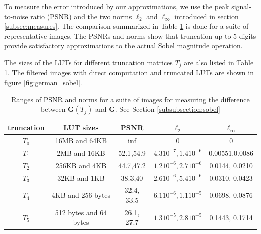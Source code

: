 \documentclass[12pt]{amsart}
\theoremstyle{definition}
\theoremstyle{remark}
\numberwithin{thm}{section}
\begin{document}
To measure the error introduced by our approximations, we use the peak signal-to-noise ratio (PSNR) and the two norms $\ell_2$ and $\ell_{\infty}$ introduced in section \ref{subsec:measures}. The comparison summarized in Table \ref{tbl:sobel} is done for a suite of representative images. The PSNRs and norms show that truncation up to $5$ digits provide satisfactory approximations to the actual Sobel magnitude operation.

The sizes of the LUTs for different truncation matrices $T_j$ are also listed in Table \ref{tbl:sobel}. The filtered images with direct computation and truncated LUTs are shown in figure \ref{fig:german_sobel}.

\begin{center}
\begin{table}
    \begin{tabular}{ | c | c | c | c | c | }
    \hline
    \hline
truncation &	LUT sizes	&PSNR 	&$\ell_2$ 	&$\ell_{\infty}$ \\ \hline
$T_0$&	16MB and 64KB		&$\inf$		&0	&0\\ \hline
$T_1$&	2MB and 16KB		&52.1,54.9	&$4.3 10^{-7}, 1.4 10^{-6}$	&0.00551,0.0086\\ \hline
$T_2$&	256KB and 4KB		&44.7,47.2	&$1.2 10^{-6}, 2.7 10^{-6}$	&0.0144, 0.0210\\ \hline
$T_3$&	32KB and 1KB		&38.3,40	&$2.6 10^{-6}, 5.4 10^{-6}$	&0.0310, 0.0423\\ \hline
$T_4$&	4KB	and 256 bytes	&32.4, 33.5	&$6.1 10^{-6}, 1.1 10^{-5}$	&0.0698, 0.0876\\ \hline
$T_5$&	512 bytes and 64 bytes &26.1, 27.7	&$1.3 10^{-5}, 2.8 10^{-5}$		&0.1443, 0.1714\\ \hline
 \end{tabular}
\caption{Ranges of PSNR and norms for a suite of images for measuring the difference between $\mathbf{G}(T_j)$ and $\mathbf{G}$. See Section \ref{subsubsection:sobel}}\label{tbl:sobel}
\end{table} 
\end{center}
\end{document}
